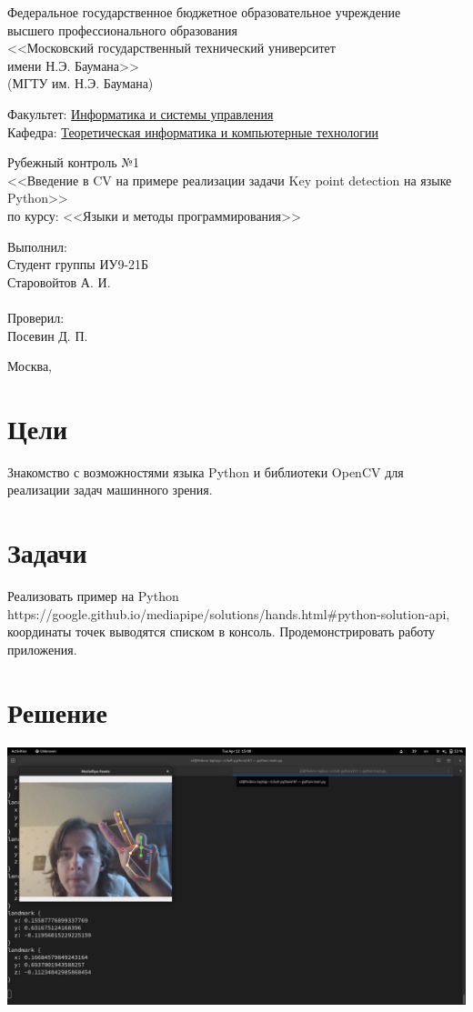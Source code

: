 \documentclass[
  12pt,
  a4paper,
]{article}
\newcommand{\thetitle}{Введение в CV на примере реализации задачи Key
point detection на языке Python}
\newcommand{\theauthor}{Старовойтов А. И.}
\newcommand{\theteacher}{Посевин Д. П.}
\newcommand{\thegroup}{ИУ9-21Б}
\newcommand{\thecourse}{Языки и методы программирования}
\newcommand{\thenumber}{1}
\renewcommand{\maketitle}
{
\newgeometry{
  left=0.7in,
  right=0.7in,
}
\begin{titlepage}
    \centering
    Федеральное государственное бюджетное образовательное учреждение\\
    высшего профессионального образования\\
    <<Московский государственный технический университет\\
    имени Н.Э. Баумана>>\\
    (МГТУ им. Н.Э. Баумана)
    \vspace{1cm}

    \flushleft

    Факультет: \underline{Информатика и системы управления}\\
    Кафедра: \underline{Теоретическая информатика и компьютерные технологии}

    \centering
    \topskip0pt
    \vspace*{\fill}
    Рубежный контроль №\thenumber{}\\
    <<\thetitle{}>>\\
    по курсу: <<\thecourse{}>>
    \vspace*{\fill}
    \centering


    \hfill\begin{minipage}{0.4\linewidth}
        Выполнил:\\
        Студент группы \thegroup{}\\
        \theauthor\\
        \\
        Проверил:\\
        \theteacher
    \end{minipage}

    \vfill

    Москва, \the\year{}

\end{titlepage}
\restoregeometry{}
}
\begin{document}
\maketitle

\hypertarget{ux446ux435ux43bux438}{%
\section{Цели}\label{ux446ux435ux43bux438}}

Знакомство с возможностями языка Python и библиотеки OpenCV для
реализации задач машинного зрения.

\hypertarget{ux437ux430ux434ux430ux447ux438}{%
\section{Задачи}\label{ux437ux430ux434ux430ux447ux438}}

Реализовать пример на Python
https://google.github.io/mediapipe/solutions/hands.html\#python-solution-api,
координаты точек выводятся списком в консоль. Продемонстрировать работу
приложения.

\hypertarget{ux440ux435ux448ux435ux43dux438ux435}{%
\section{Решение}\label{ux440ux435ux448ux435ux43dux438ux435}}

\includegraphics{1.png}
\end{document}
